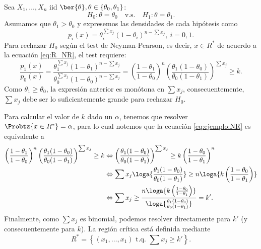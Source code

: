 \begin{example}
	Sea $X_1,\ldots, X_n$ iid $\ber{\theta}, \theta\in\{\theta_0,\theta_1\}$: 
	\begin{equation}
		H_0:\theta =\theta_0\quad \text{v.s.}\quad H_1:\theta = \theta_1.
	\end{equation} 
	Asumamos que $\theta_1>\theta_0$ y expresemos las densidades de cada hipótesis como 
	\begin{equation}
		p_i(x) = \theta_i^{\sum x_j}(1-\theta_i)^{n-\sum x_j},\ i=0,1.
	\end{equation}
	Para rechazar $H_0$ según el test de Neyman-Pearson, es decir, $x\in R^*$ de acuerdo a la ecuación \eqref{eq:R_NR}, el test requiere: 
	\begin{equation}
		\label{eq:ejemplo:NR}
		\frac{p_1(x)}{p_0(x)} = \frac{\theta_1^{\sum x_j}(1-\theta_1)^{n-\sum x_j}}{\theta_0^{\sum x_j}(1-\theta_0)^{n-\sum x_j}} = \left(\frac{1-\theta_1}{1-\theta_0}\right)^n\left(\frac{\theta_1(1-\theta_0)}{\theta_0(1-\theta_1)}\right)^{\sum x_j}\geq k. 
	\end{equation}
	Como $\theta_1\geq\theta_0$, la expresión anterior es monótona en  $\sum x_j$, consecuentemente, $\sum x_j$ debe ser lo suficientemente grande para rechazar $H_0$. 
	
	Para calcular el valor de $k$ dado un $\alpha$, tenemos que resolver $\Probtz{x\in R^*} = \alpha$, para lo cual notemos que la ecuación \eqref{eq:ejemplo:NR} es equivalente a 
	\begin{align}
	 	\left(\frac{1-\theta_1}{1-\theta_0}\right)^n\left(\frac{\theta_1(1-\theta_0)}{\theta_0(1-\theta_1)}\right)^{\sum x_j}\geq k 
	 	& \Leftrightarrow 
	 	\left(\frac{\theta_1(1-\theta_0)}{\theta_0(1-\theta_1)}\right)^{\sum x_j}\geq k \left(\frac{1-\theta_0}{1-\theta_1}\right)^n\\
	 	& \Leftrightarrow 
	 	\sum x_j \loga{\frac{\theta_1(1-\theta_0)}{\theta_0(1-\theta_1)}}\geq n \loga{k \left(\frac{1-\theta_0}{1-\theta_1}\right)} \nonumber\\
	 	& \Leftrightarrow 
	 	\sum x_j \geq \frac{n \loga{k \left(\frac{1-\theta_0}{1-\theta_1}\right)}}{\loga{\frac{\theta_1(1-\theta_0)}{\theta_0(1-\theta_1)}}} = k'. \nonumber
	 \end{align} 
	 Finalmente, como $\sum x_j$ es binomial, podemos resolver directamente para $k'$ (y consecuentemente para $k$). La región crítica  está definida mediante 
	 \begin{equation}
	     R^* = \left\{(x_1,\ldots,x_1) \text{ t.q. } \sum x_j\geq k'\right\}.
	 \end{equation}
\end{example}

